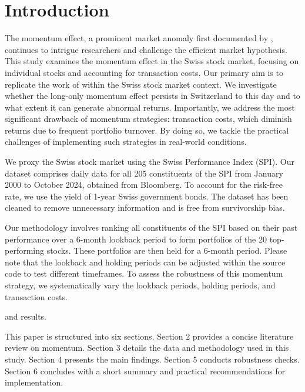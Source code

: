 \documentclass[a4paper,12pt]{article}
\begin{document}
\setcounter{page}{1}
\tableofcontents

\clearpage
\listoftables
\listoffigures
\clearpage


\setcounter{page}{1}
\section{Introduction}
The momentum effect, a prominent market anomaly first documented by \cite{jegatit1993}, continues to intrigue researchers and challenge the efficient market hypothesis. This study examines the momentum effect in the Swiss stock market, focusing on individual stocks and accounting for transaction costs. Our primary aim is to replicate the work of \cite{jegatit1993} within the Swiss stock market context. We investigate whether the long-only momentum effect persists in Switzerland to this day and to what extent it can generate abnormal returns. Importantly, we address the most significant drawback of momentum strategies: transaction costs, which diminish returns due to frequent portfolio turnover. By doing so, we tackle the practical challenges of implementing such strategies in real-world conditions. 

We proxy the Swiss stock market using the Swiss Performance Index (SPI). Our dataset comprises daily data for all 205 constituents of the SPI from January 2000 to October 2024, obtained from Bloomberg. To account for the risk-free rate, we use the yield of 1-year Swiss government bonds. The dataset has been cleaned to remove unnecessary information and is free from survivorship bias. 

Our methodology involves ranking all constituents of the SPI based on their past performance over a 6-month lookback period to form portfolios of the 20 top-performing stocks. These portfolios are then held for a 6-month period. Please note that the lookback and holding periods can be adjusted within the source code to test different timeframes. To assess the robustness of this momentum strategy, we systematically vary the lookback periods, holding periods, and transaction costs.  

and results. 

This paper is structured into six sections. Section 2 provides a concise literature review on momentum. Section 3 details the data and methodology used in this study. Section 4 presents the main findings. Section 5 conducts robustness checks. Section 6 concludes with a short summary and practical recommendations for implementation.
\end{document}
